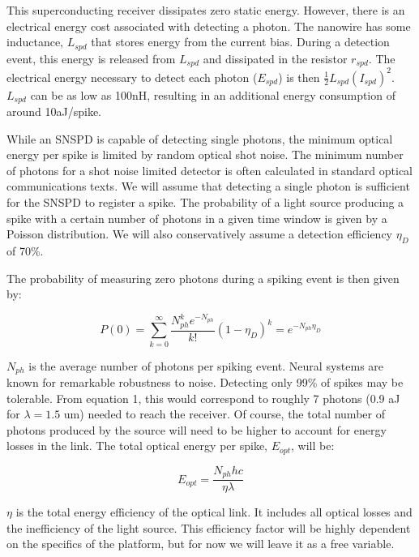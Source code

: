 \documentclass{article}
\begin{document}
This superconducting receiver dissipates zero static energy. However, there is an electrical energy cost associated with detecting a photon. The nanowire has some inductance, $L_{spd}$ that stores energy from the current bias. During a detection event, this energy is released from $L_{spd}$ and dissipated in the resistor $r_{spd}$. The electrical energy necessary to detect each photon ($E_{spd}$) is then $\frac{1}{2}L_{spd}(I_{spd})^2$. $L_{spd}$ can be as low as 100nH, resulting in an additional energy consumption of around 10aJ/spike.

While an SNSPD is capable of detecting single photons, the minimum optical energy per spike is limited by random optical shot noise. The minimum number of photons for a shot noise limited detector is often calculated in standard optical communications texts. We will assume that detecting a single photon is sufficient for the SNSPD to register a spike. The probability of a light source producing a spike with a certain number of photons in a given time window is given by a Poisson distribution. We will also conservatively assume a detection efficiency $\eta_D$ of 70\%.

The probability of measuring zero photons during a spiking event is then given by: \newline

\begin{equation}
    P(0) = \sum_{k=0}^{\infty} \frac{N_{ph}^k e^{-N_{ph}}}{k!}(1-\eta_D)^{k} = e^{-N_{ph}\eta_D}
\end{equation}

$N_{ph}$ is the average number of photons per spiking event. Neural systems are known for remarkable robustness to noise. Detecting only 99\% of spikes may be tolerable. From equation 1, this would correspond to roughly 7 photons (0.9 aJ for $\lambda = 1.5$ um) needed to reach the receiver. Of course, the total number of photons produced by the source will need to be higher to account for energy losses in the link. The total optical energy per spike, $E_{opt}$, will be:

\begin{equation}
    E_{opt} = \frac{N_{ph} h c}{\eta\lambda}
\end{equation}

$\eta$ is the total energy efficiency of the optical link. It includes all optical losses and the inefficiency of the light source. This efficiency factor will be highly dependent on the specifics of the platform, but for now we will leave it as a free variable.
\end{document}
